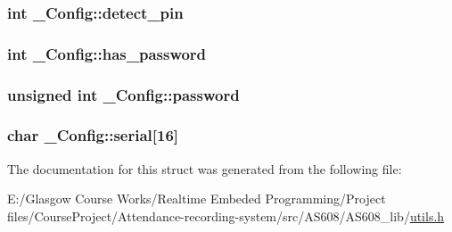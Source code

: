 \subsubsection[{detect\+\_\+pin}]{\setlength{\rightskip}{0pt plus 5cm}int \+\_\+\+Config\+::detect\+\_\+pin}\label{struct___config_adb2b21077bd3ab6634ef2e9a8742f0de}
\hypertarget{struct___config_a13cb1dcf7be8b47adf6e093469b3ec00}{}
\subsubsection[{has\+\_\+password}]{\setlength{\rightskip}{0pt plus 5cm}int \+\_\+\+Config\+::has\+\_\+password}\label{struct___config_a13cb1dcf7be8b47adf6e093469b3ec00}
\hypertarget{struct___config_a73b3e7f3be7abbdd862dff7ef3a4f071}{}
\subsubsection[{password}]{\setlength{\rightskip}{0pt plus 5cm}unsigned int \+\_\+\+Config\+::password}\label{struct___config_a73b3e7f3be7abbdd862dff7ef3a4f071}
\hypertarget{struct___config_a84c4d0ac029c3a60e53390a06b062eb4}{}
\subsubsection[{serial}]{\setlength{\rightskip}{0pt plus 5cm}char \+\_\+\+Config\+::serial\mbox{[}16\mbox{]}}\label{struct___config_a84c4d0ac029c3a60e53390a06b062eb4}


The documentation for this struct was generated from the following file\+:\begin{DoxyCompactItemize}
\item 
E\+:/\+Glasgow Course Works/\+Realtime Embeded Programming/\+Project files/\+Course\+Project/\+Attendance-\/recording-\/system/src/\+A\+S608/\+A\+S608\+\_\+lib/\hyperlink{utils_8h}{utils.\+h}\end{DoxyCompactItemize}
